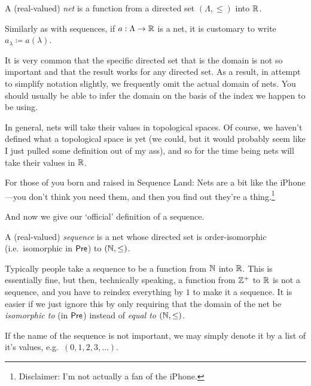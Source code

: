 \begin{dfn}[Net]
A (real-valued) \emph{net} is a function from a directed set $(\Lambda ,\leq )$ into $\mathbb{R}$.
\begin{rmk}
Similarly as with sequences, if $a:\Lambda \rightarrow \mathbb{R}$ is a net, it is customary to write $a_\lambda \coloneqq a(\lambda )$.
\end{rmk}
\begin{rmk}
It is very common that the specific directed set that is the domain is not so important and that the result works for any directed set.  As a result, in attempt to simplify notation slightly, we frequently omit the actual domain of nets.  You should usually be able to infer the domain on the basis of the index we happen to be using.
\end{rmk}
\begin{rmk}
In general, nets will take their values in topological spaces.  Of course, we haven't defined what a topological space is yet (we could, but it would probably seem like I just pulled some definition out of my ass), and so for the time being nets will take their values in $\mathbb{R}$.
\end{rmk}
\begin{rmk}
For those of you born and raised in Sequence Land:  Nets are a bit like the iPhone---you don't think you need them, and then you find out they're a thing.\footnote{Disclaimer:  I'm not actually a fan of the iPhone.}
\end{rmk}
\end{dfn}
And now we give our `official' definition of a sequence.
\begin{dfn}[Sequence]\label{dfn3.3.4}
A (real-valued) \emph{sequence} is a net whose directed set is order-isomorphic (i.e.~isomorphic in $\mathsf{Pre}$) to $(\mathbb{N} ,\leq )$.
\begin{rmk}
Typically people take a sequence to be a function from $\mathbb{N}$ into $\mathbb{R}$.  This is essentially fine, but then, technically speaking, a function from $\mathbb{Z} ^+$ to $\mathbb{R}$ is not a sequence, and you have to reindex everything by $1$ to make it a sequence.  It is easier if we just ignore this by only requiring that the domain of the net be \emph{isomorphic to} (in $\mathsf{Pre}$) instead of \emph{equal to} $(\mathbb{N} ,\leq )$.
\end{rmk}
\begin{rmk}
If the name of the sequence is not important, we may simply denote it by a list of it's values, e.g.~$(0,1,2,3,\ldots )$.
\end{rmk}
\end{dfn}
